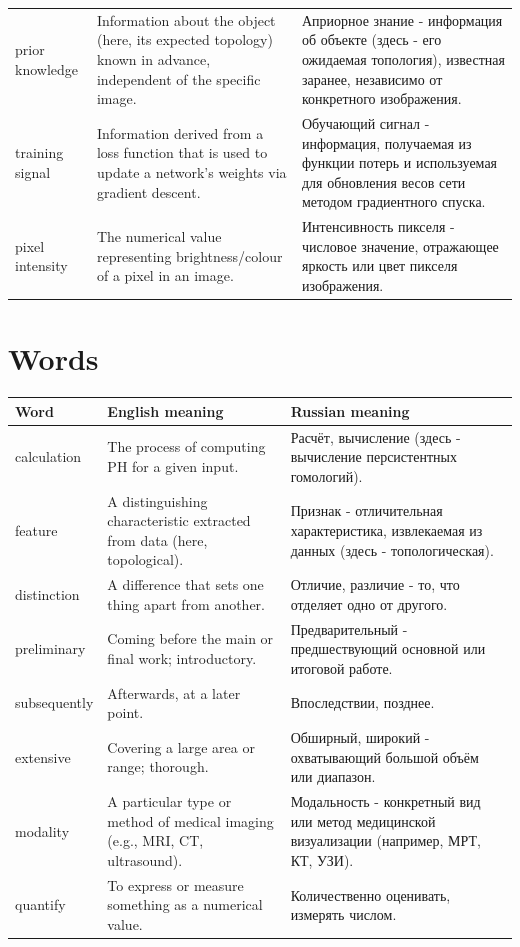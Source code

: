 \documentclass[12pt,a4paper]{article}
\begin{document}
\begin{longtable}{p{3.2cm}p{5.3cm}p{6.8cm}}
prior knowledge &
Information about the object (here, its expected topology) known in
advance, independent of the specific image. &
Априорное знание - информация об объекте (здесь - его ожидаемая
топология), известная заранее, независимо от конкретного
изображения. \\

training signal &
Information derived from a loss function that is used to update a
network's weights via gradient descent. &
Обучающий сигнал - информация, получаемая из функции потерь и
используемая для обновления весов сети методом градиентного спуска. \\

pixel intensity &
The numerical value representing brightness/colour of a pixel in an
image. &
Интенсивность пикселя - числовое значение, отражающее яркость
или цвет пикселя изображения. \\
\end{longtable}

\section*{Words}

\begin{longtable}{p{2.6cm}p{5.4cm}p{7.3cm}}
\textbf{Word} & \textbf{English meaning} & \textbf{Russian meaning} \\
\hline
\endhead
calculation &
The process of computing PH for a given input. &
Расчёт, вычисление (здесь - вычисление персистентных гомологий). \\

feature &
A distinguishing characteristic extracted from data (here,
topological). &
Признак - отличительная характеристика, извлекаемая из данных
(здесь - топологическая). \\

distinction &
A difference that sets one thing apart from another. &
Отличие, различие - то, что отделяет одно от другого. \\

preliminary &
Coming before the main or final work; introductory. &
Предварительный - предшествующий основной или итоговой работе. \\

subsequently &
Afterwards, at a later point. &
Впоследствии, позднее. \\

extensive &
Covering a large area or range; thorough. &
Обширный, широкий - охватывающий большой объём или диапазон. \\

modality &
A particular type or method of medical imaging (e.g., MRI, CT,
ultrasound). &
Модальность - конкретный вид или метод медицинской визуализации
(например, МРТ, КТ, УЗИ). \\

quantify &
To express or measure something as a numerical value. &
Количественно оценивать, измерять числом. \\
\end{longtable}
\end{document}
